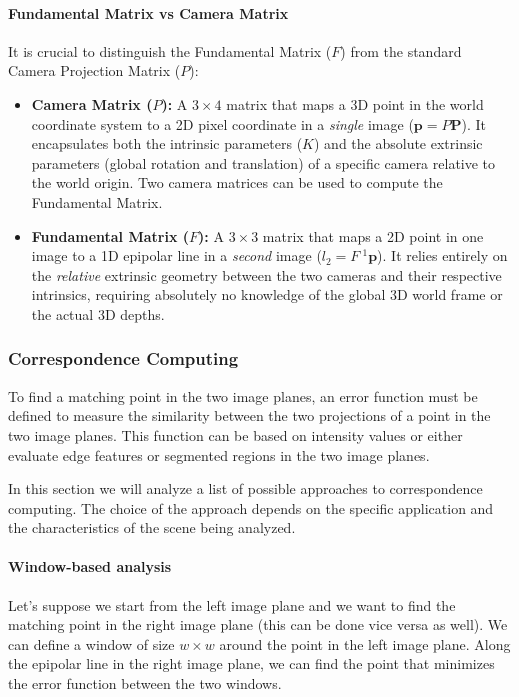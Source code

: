 \paragraph{Fundamental Matrix vs Camera Matrix} 
It is crucial to distinguish the Fundamental Matrix ($F$) from the standard Camera Projection Matrix ($P$):
\begin{itemize}
    \item \textbf{Camera Matrix ($P$):} A $3 \times 4$ matrix that maps a 3D point in the world coordinate system to a 2D pixel coordinate in a \textit{single} image ($\boldsymbol{p} = P \boldsymbol{P}$). 
    It encapsulates both the intrinsic parameters ($K$) and the absolute extrinsic parameters (global rotation and translation) of a specific camera relative to the world origin.
    Two camera matrices can be used to compute the Fundamental Matrix.
    \item \textbf{Fundamental Matrix ($F$):} A $3 \times 3$ matrix that maps a 2D point in one image to a 1D epipolar line in a \textit{second} image ($l_2 = F \: ^1\boldsymbol{p}$). 
    It relies entirely on the \textit{relative} extrinsic geometry between the two cameras and their respective intrinsics, 
    requiring absolutely no knowledge of the global 3D world frame or the actual 3D depths.
\end{itemize}

\subsubsection{Correspondence Computing}
To find a matching point in the two image planes, an error function must be defined to measure the similarity between the two projections of a point in the two image planes.
This function can be based on intensity values or either evaluate edge features or segmented regions in the two image planes.

In this section we will analyze a list of possible approaches to correspondence computing. The choice of the approach depends
on the specific application and the characteristics of the scene being analyzed.

\paragraph{Window-based analysis}
Let's suppose we start from the left image plane and we want to find the matching point in the right image plane (this can be done vice versa as well).
We can define a window of size \( w \times w \) around the point in the left image plane. Along the epipolar line in the right image plane,
we can find the point that minimizes the error function between the two windows.

